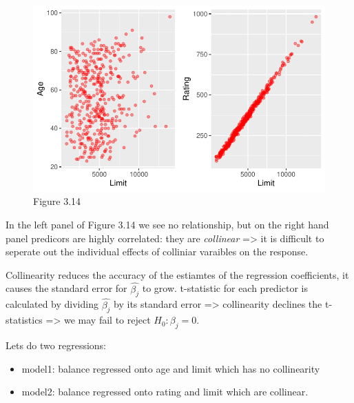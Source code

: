 \documentclass[
  letterpaper,
  DIV=11,
  numbers=noendperiod]{scrreprt}
\providecommand{\tightlist}{%
  \setlength{\itemsep}{0pt}\setlength{\parskip}{0pt}}\usepackage{longtable,booktabs,array}
\begin{document}
\begin{figure}[H]

{\centering \includegraphics{Chapter3_files/figure-pdf/unnamed-chunk-102-1.pdf}

}

\caption{Figure 3.14}

\end{figure}

In the left panel of Figure 3.14 we see no relationship, but on the
right hand panel predicors are highly correlated: they are
\emph{collinear} =\textgreater{} it is difficult to seperate out the
individual effects of colliniar varaibles on the response.

Collinearity reduces the accuracy of the estiamtes of the regression
coefficients, it causes the standard error for \(\hat{\beta_j}\) to
grow. t-statistic for each predictor is calculated by dividing
\(\hat{\beta_j}\) by its standard error =\textgreater{} collinearity
declines the t-statistics =\textgreater{} we may fail to reject
\(H_0:\beta_j = 0\).

Lets do two regressions:

\begin{itemize}
\tightlist
\item
  model1: balance regressed onto age and limit which has no collinearity
\item
  model2: balance regressed onto rating and limit which are collinear.
\end{itemize}
\end{document}
